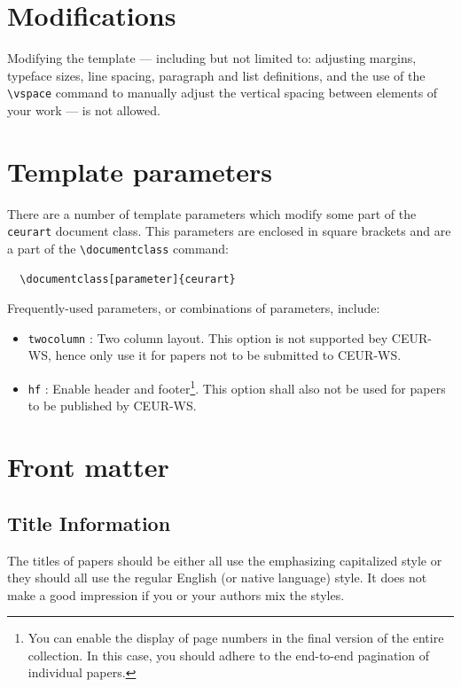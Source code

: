 \documentclass[
]{ceurart}
\begin{document}
\section{Modifications}

Modifying the template --- including but not limited to: adjusting
margins, typeface sizes, line spacing, paragraph and list definitions,
and the use of the \verb|\vspace| command to manually adjust the
vertical spacing between elements of your work --- is not allowed.

\section{Template parameters}

There are a number of template
parameters which modify some part of the \verb|ceurart| document class.
This parameters are enclosed in square
brackets and are a part of the \verb|\documentclass| command:
\begin{lstlisting}
  \documentclass[parameter]{ceurart}
\end{lstlisting}

Frequently-used parameters, or combinations of parameters, include:
\begin{itemize}
  \item \verb|twocolumn| : Two column layout. This option is not supported bey CEUR-WS, hence only use it for papers not to be submitted to CEUR-WS.
  \item \verb|hf| : Enable header and footer\footnote{You can enable
          the display of page numbers in the final version of the entire
          collection. In this case, you should adhere to the end-to-end
          pagination of individual papers.}.  This option shall also not be used for papers to be published by CEUR-WS.
\end{itemize}

\section{Front matter}

\subsection{Title Information}

The titles of papers should be either all use the emphasizing
capitalized style or they should all use the regular English (or
native language) style. It does not make a good impression if you or
your authors mix the styles.
\end{document}

